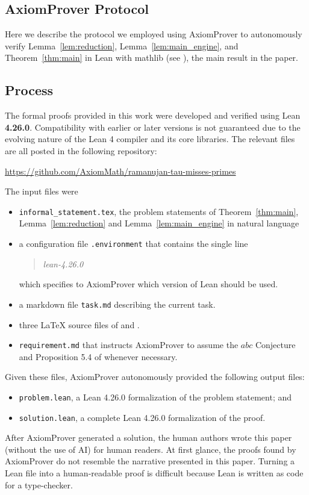 \documentclass[12pt]{amsart}
\theoremstyle{remark}
\numberwithin{equation}{section}
\begin{document}
\subsection*{AxiomProver Protocol}
Here we describe the protocol we employed using AxiomProver to
autonomously verify Lemma~\ref{lem:reduction}, Lemma~\ref{lem:main_engine},
and Theorem~\ref{thm:main} in Lean with mathlib (see \cite{Lean, Mathlib2020}),
the main result in the paper.

\subsection*{Process}
The formal proofs provided in this work were developed and verified using Lean \textbf{4.26.0}.
Compatibility with earlier or later versions is not guaranteed due to the
evolving nature of the Lean 4 compiler and its core libraries.
The relevant files are all posted in the following repository:
\begin{center}
  \url{https://github.com/AxiomMath/ramanujan-tau-misses-primes}
\end{center}
The input files were
\begin{itemize}
  \item \texttt{informal\_statement.tex}, the problem statements of
   Theorem~\ref{thm:main}, Lemma~\ref{lem:reduction} and Lemma~\ref{lem:main_engine}
   in natural language
  \item a configuration file \texttt{.environment} that contains the single line
  \begin{quote}
    \slshape
    lean-4.26.0
  \end{quote}
  which specifies to AxiomProver which version of Lean should be used.
  \item a markdown file \texttt{task.md} describing the current task.
  \item three LaTeX source files of \cite{ BalakrishnanCraigOno2022, BCOT2023} and \cite{Xiong2025}.
  \item \texttt{requirement.md} that instructs AxiomProver to assume the $abc$ Conjecture and Proposition 5.4 of \cite{Xiong2025} whenever necessary.
 \end{itemize}
Given these files,
AxiomProver autonomously provided the following output files:
\begin{itemize}
  \item \texttt{problem.lean}, a Lean 4.26.0 formalization of the problem statement; and
  \item \texttt{solution.lean}, a complete Lean 4.26.0 formalization of the proof.
\end{itemize}
After AxiomProver generated a solution, the human authors wrote this paper
(without the use of AI) for human readers.
At first glance, the proofs found by AxiomProver do not resemble the narrative presented in this paper.
Turning a Lean file into a human-readable proof is difficult
because Lean is written as code for a type-checker.
\end{document}
